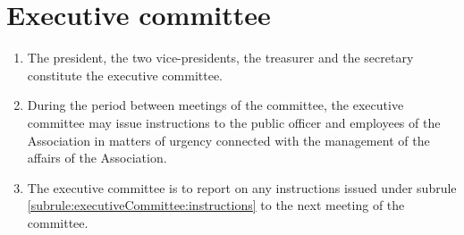 \section{Executive committee}
\label{rule:executiveCommittee}

\begin{enumerate}
	\item The president, the two vice-presidents, the treasurer and the secretary constitute the executive committee.
	\item \label{subrule:executiveCommittee:instructions} During the period between meetings of the committee, the executive committee may issue instructions to the public officer and employees of the Association in matters of urgency connected with the management of the affairs of the Association.
	\item The executive committee is to report on any instructions issued under subrule \ref{subrule:executiveCommittee:instructions} to the next meeting of the committee.
\end{enumerate}

